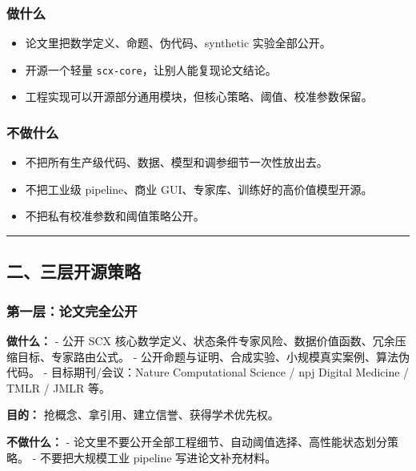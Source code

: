 \documentclass[
  12pt,
]{ctexart}
\providecommand{\tightlist}{%
  \setlength{\itemsep}{0pt}\setlength{\parskip}{0pt}}
\begin{document}
\subsubsection{做什么}\label{ux505aux4ec0ux4e48}

\begin{itemize}
\tightlist
\item
  论文里把数学定义、命题、伪代码、synthetic 实验全部公开。
\item
  开源一个轻量 \texttt{scx-core}，让别人能复现论文结论。
\item
  工程实现可以开源部分通用模块，但核心策略、阈值、校准参数保留。
\end{itemize}

\subsubsection{不做什么}\label{ux4e0dux505aux4ec0ux4e48}

\begin{itemize}
\tightlist
\item
  不把所有生产级代码、数据、模型和调参细节一次性放出去。
\item
  不把工业级 pipeline、商业 GUI、专家库、训练好的高价值模型开源。
\item
  不把私有校准参数和阈值策略公开。
\end{itemize}

\begin{center}\rule{0.5\linewidth}{0.5pt}\end{center}

\subsection{二、三层开源策略}\label{ux4e8cux4e09ux5c42ux5f00ux6e90ux7b56ux7565}

\subsubsection{第一层：论文完全公开}\label{ux7b2cux4e00ux5c42ux8bbaux6587ux5b8cux5168ux516cux5f00}

\textbf{做什么：} - 公开 SCX
核心数学定义、状态条件专家风险、数据价值函数、冗余压缩目标、专家路由公式。
- 公开命题与证明、合成实验、小规模真实案例、算法伪代码。 -
目标期刊/会议：Nature Computational Science / npj Digital Medicine /
TMLR / JMLR 等。

\textbf{目的：} 抢概念、拿引用、建立信誉、获得学术优先权。

\textbf{不做什么：} -
论文里不要公开全部工程细节、自动阈值选择、高性能状态划分策略。 -
不要把大规模工业 pipeline 写进论文补充材料。
\end{document}
